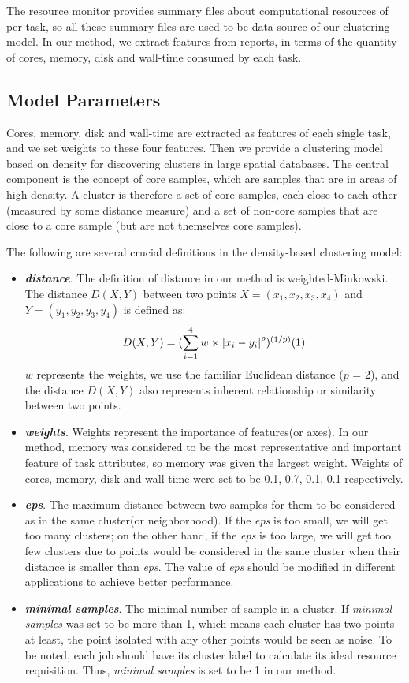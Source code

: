 \documentclass[conference]{IEEEtran}
\begin{document}
The resource monitor provides summary files about computational resources of per task, so all these summary files are used to be data source of our clustering model. In our method, we extract features from reports, in terms of the quantity of cores, memory, disk and wall-time consumed by each task.

\subsection{Model Parameters}
Cores, memory, disk and wall-time are extracted as features of each single task, and we set weights to these four features. Then we provide a clustering model based on density for discovering clusters in large spatial databases. The central component is the concept of core samples, which are samples that are in areas of high density. A cluster is therefore a set of core samples, each close to each other (measured by some distance measure) and a set of non-core samples that are close to a core sample (but are not themselves core samples).

The following are several crucial definitions in the density-based clustering model:

\begin{itemize}

\item \textbf{\emph{distance}}. The definition of distance in our method is weighted-Minkowski. The distance $D(X,Y)$ between two points $X=(x_1, x_2, x_3, x_4)$ and $Y=(y_1, y_2, y_3, y_4)$ is defined as:
$$
D(X,Y)=({\sum_{i=1}^{4}w\times{\left|{x_i-y_i} \right|^p}})^{(1/p)} \relax{(1)}
$$
$w$ represents the weights, we use the familiar Euclidean distance ($p$ = 2), and the distance $D(X,Y)$ also represents inherent relationship or similarity between two points.
\item \textbf{\emph{weights}}. Weights represent the importance of features(or axes). In our method, memory was considered to be the most representative and important feature of task attributes, so memory was given the largest weight. Weights of cores, memory, disk and wall-time were set to be 0.1, 0.7, 0.1, 0.1 respectively.
\item \textbf{\emph{eps}}. The maximum distance between two samples for them to be considered as in the same cluster(or neighborhood). If the \emph{eps} is too small, we will get too many clusters; on the other hand, if the \emph{eps} is too large, we will get too few clusters due to points would be considered in the same cluster when their distance is smaller than \emph{eps}. The value of \emph{eps} should be modified in different applications to achieve better performance.
\item \textbf{\emph{minimal samples}}. The minimal number of sample in a cluster. If \emph{minimal samples} was set to be more than 1, which means each cluster has two points at least, the point isolated with any other points would be seen as noise. To be noted, each job should have its cluster label to calculate its ideal resource requisition. Thus, \emph{minimal samples} is set to be 1 in our method.

\end{itemize}
\end{document}
